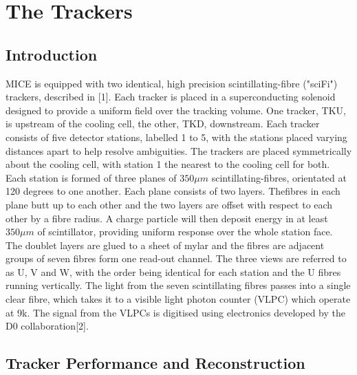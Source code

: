 \graphicspath{{06-Tracker/Figures/}}

\section{The Trackers}
\label{Sect:Tracker}

\subsection{Introduction}
MICE is equipped with two identical, high precision scintillating-fibre ("sciFi") trackers, described in [1]. Each tracker is placed in a superconducting solenoid designed to provide a uniform field over the tracking volume. One tracker, TKU, is upstream of the cooling cell, the other, TKD, downstream. Each tracker consists of five detector stations, labelled 1 to 5, with the stations placed varying distances apart to help resolve ambiguities. The trackers are placed symmetrically about the cooling cell, with station 1 the nearest to the cooling cell for both. Each station is formed of three planes of $350\mu m$ scintillating-fibres, orientated at 120 degrees to one another. Each plane consists of two layers. Thefibres in each plane butt up to each other and the two layers are offset with respect to each other by a fibre radius. A charge particle will then deposit energy in at least $350\mu m$ of scintillator, providing uniform response over the whole station face. The doublet layers are glued to a sheet of mylar and the fibres are adjacent groups of seven fibres form one read-out channel. The three views are referred to as U, V and W, with the order being identical for each station and the U fibres running vertically.
The light from the seven scintillating fibres passes into a single clear fibre, which takes it to a visible light photon counter (VLPC) which operate at 9k. The signal from the VLPCs is digitised using electronics developed by the D0 collaboration[2].


\subsection{Tracker Performance and Reconstruction}

